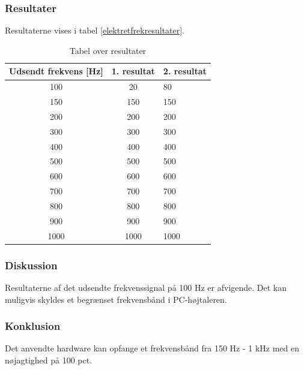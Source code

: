 		\subsubsection{Resultater}
		Resultaterne vises i tabel \ref{elektretfrekresultater}. 
		\begin{table}[]
				\centering
				\caption{Tabel over resultater}
				\label{elektrettofrekresultater}
				\begin{tabular}{lll}
					\multicolumn{1}{l|}{\textbf{Udsendt frekvens {[}Hz{]}}} & 	
					\multicolumn{1}{l|}{\textbf{1. resultat}} & \textbf{2. resultat} \\ \hline
					\multicolumn{1}{c|}{100}& 
					\multicolumn{1}{c|}{20}&80\\
					\multicolumn{1}{c|}{150}& 
					\multicolumn{1}{c|}{150}&150\\
					\multicolumn{1}{c|}{200}& 
					\multicolumn{1}{c|}{200}&200\\
					\multicolumn{1}{c|}{300}& 
					\multicolumn{1}{c|}{300}&300\\
					\multicolumn{1}{c|}{400}& 
					\multicolumn{1}{c|}{400}&400\\
					\multicolumn{1}{c|}{500}& 
					\multicolumn{1}{c|}{500}&500\\
					\multicolumn{1}{c|}{600}& 
					\multicolumn{1}{c|}{600}&600\\
					\multicolumn{1}{c|}{700}& 
					\multicolumn{1}{c|}{700}&700\\
					\multicolumn{1}{c|}{800}& 
					\multicolumn{1}{c|}{800}&800\\
					\multicolumn{1}{c|}{900}& 
					\multicolumn{1}{c|}{900}&900\\
					\multicolumn{1}{c|}{1000}& 
					\multicolumn{1}{c|}{1000}&1000\\
                   
				\end{tabular}
			\end{table}
		
		\subsubsection{Diskussion} 
		Resultaterne af det udsendte frekvenssignal på 100 Hz er afvigende. Det kan muligvis skyldes et begrænset frekvensbånd i PC-højtaleren. 
		\subsubsection{Konklusion}
	Det anvendte hardware kan opfange et frekvensbånd fra 150 Hz - 1 kHz med en nøjagtighed på 100 pct.  
